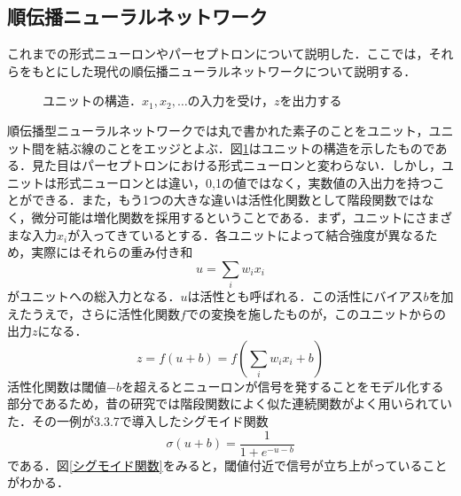 \documentclass[a4paper,11pt]{jsreport}
\begin{document}
\subsection{順伝播ニューラルネットワーク}
これまでの形式ニューロンやパーセプトロンについて説明した．ここでは，それらをもとにした現代の順伝播ニューラルネットワークについて説明する．\par
\begin{figure}[H]
  \centering
  \caption{ユニットの構造．$x_1,x_2,\dots$の入力を受け，$z$を出力する}
  \label{ユニットの構造}
\end{figure}
順伝播型ニューラルネットワークでは丸で書かれた素子のことをユニット，ユニット間を結ぶ線のことをエッジとよぶ．図\ref{ユニットの構造}はユニットの構造を示したものである．見た目はパーセプトロンにおける形式ニューロンと変わらない．しかし，ユニットは形式ニューロンとは違い，0,1の値ではなく，実数値の入出力を持つことができる．また，もう1つの大きな違いは活性化関数として階段関数ではなく，微分可能は増化関数を採用するということである．まず，ユニットにさまざまな入力$x_i$が入ってきているとする．各ユニットによって結合強度が異なるため，実際にはそれらの重み付き和
\begin{equation}
  u = \sum_{i} w_i x_i
\end{equation}
がユニットへの総入力となる．$u$は活性とも呼ばれる．この活性にバイアス$b$を加えたうえで，さらに活性化関数$f$での変換を施したものが，このユニットからの出力$z$になる．
\begin{equation}
  z = f(u + b) = f\left( \sum_{i} w_i x_i + b \right)
\end{equation}
活性化関数は閾値$-b$を超えるとニューロンが信号を発することをモデル化する部分であるため，昔の研究では階段関数によく似た連続関数がよく用いられていた．その一例が3.3.7で導入したシグモイド関数
\begin{equation}
  \sigma(u + b) = \frac{1}{1 + e^{-u-b}}
\end{equation}
である．図\ref{シグモイド関数}をみると，閾値付近で信号が立ち上がっていることがわかる．
\end{document}
